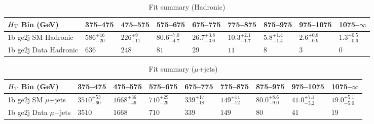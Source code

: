 \documentclass[8pt]{article}
\def\scalht{\mbox{$H_{\rm{T}}$}\xspace}
\newcommand\T{\rule{0pt}{2.6ex}}
\begin{document}
\begin{table}[ht!]
\caption{Fit summary (Hadronic)}
\label{tab:ensemble-summary}
\centering
\begin{tabular}{ lllllllll }

\hline
\scalht Bin (GeV)       & 375--475                       & 475--575                       & 575--675                       & 675--775                       & 775--875                       & 875--975                       & 975--1075                      & 1075--$\infty$                 \\ [1.000000ex]
\hline
1b ge2j SM Hadronic\T   & $586^{+16}_{-20}$              & $226^{+9}_{-11}$               & $80.6^{+7.0}_{-4.7}$           & $26.7^{+3.8}_{-3.0}$           & $10.3^{+2.1}_{-1.7}$           & $5.8^{+1.4}_{-1.4}$            & $2.6^{+0.8}_{-0.9}$            & $1.3^{+0.5}_{-0.6}$            \\ 
1b ge2j Data Hadronic\T & $636$                          & $248$                          & $81$                           & $29$                           & $11$                           & $8$                            & $3$                            & $0$                            \\ 
\hline

\end{tabular}
\end{table}
\begin{table}[ht!]
\caption{Fit summary ($\mu$+jets)}
\label{tab:ensemble-summary}
\centering
\begin{tabular}{ lllllllll }

\hline
\scalht Bin (GeV)       & 375--475                       & 475--575                       & 575--675                       & 675--775                       & 775--875                       & 875--975                       & 975--1075                      & 1075--$\infty$                 \\ [1.000000ex]
\hline
1b ge2j SM $\mu$+jets\T & $3510^{+53}_{-60}$             & $1668^{+36}_{-46}$             & $710^{+29}_{-29}$              & $339^{+17}_{-18}$              & $149^{+14}_{-12}$              & $80.0^{+8.6}_{-9.0}$           & $41.0^{+7.1}_{-5.2}$           & $19.0^{+5.1}_{-5.0}$           \\ 
1b ge2j Data $\mu$+jets\T & $3510$                         & $1668$                         & $710$                          & $339$                          & $149$                          & $80$                           & $41$                           & $19$                           \\ 
\hline

\end{tabular}
\end{table}
\end{document}

